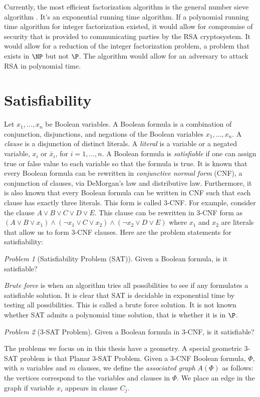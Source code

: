 \documentclass[10pt]{CSUNthesis}
\theoremstyle{plain}%
\theoremstyle{definition}
\theoremstyle{remark}
\newtheorem{prob}{Problem}
\begin{document}
Currently, the most efficient factorization algorithm is the general number sieve algorithm \cite{lenstra1993number}.
It's an exponential running time algorithm.
If a polynomial running time algorithm for integer factorization existed, it would allow for compromise of security that is provided to communicating parties by the RSA cryptosystem.
It would allow for a reduction of the integer factorization problem, a problem that exists in $\NP$ but not $\P$.
The algorithm would allow for an adversary to attack RSA \cite{menezes1996handbook} in polynomial time.



\section{Satisfiability}\label{sec:logic}
Let $x_1, \dots, x_n$ be Boolean variables.  A Boolean formula is a combination of conjunction, 
disjunctions, and negations of the Boolean variables $x_1,  \dots, x_n$.   
A \textit{clause} is a disjunction of distinct literals.  
A \textit{literal} is a variable or a negated variable, $x_i$ or $\bar{x}_i$, for $i = 1,\dots,n$. 
A Boolean formula is \textit{satisfiable} if one can assign true or false value to each variable so that the formula is true. 
It is known that every Boolean formula can be rewritten in \textit{conjunctive normal form} (CNF), a conjunction of clauses, via DeMorgan's law and distributive law.   
Furthermore, it is also known that every Boolean formula can be written in CNF such that each clause has exactly three literals. 
This form is called 3-CNF.  
For example, consider the clause $A \lor B \lor C \lor D \lor E$. 
This clause can be rewritten in 3-CNF form as $(A \lor B \lor x_1) \land (\lnot x_1 \lor C \lor x_2) \land (\lnot x_2 \lor D \lor E)$ where $x_1$ and $x_2$ are literals that allow us to form 3-CNF clauses.
Here are the problem statements for satisfiability:
\begin{prob}[Satisfiability Problem (SAT)]\label{prob:Satisfiability-1}%
Given a Boolean formula, is it satisfiable? \cite{skiena2009algorithm}
\end{prob} 
\textit{Brute force} is when an algorithm tries all possibilities to see if any formulates a satisfiable solution.
It is clear that SAT is decidable in exponential time by testing all possibilities.
This is called a brute force solution.
It is not known whether SAT admits a polynomial time solution, that is whether it is in $\P$. 
\begin{prob}[3-SAT Problem]
Given a Boolean formula in 3-CNF, is it satisfiable?
\end{prob}
The problems we focus on in this thesis have a geometry.  
A special geometric 3-SAT problem is that Planar 3-SAT Problem.   
Given a 3-CNF Boolean formula, $\Phi$, with $n$ variables and $m$ clauses, 
we define the \textit{associated graph} $A(\Phi)$ as follows: the vertices correspond to the variables and clauses in $\Phi$.   
We place an edge in the graph if variable $x_i$ appears in clause $C_j$.
\end{document}
